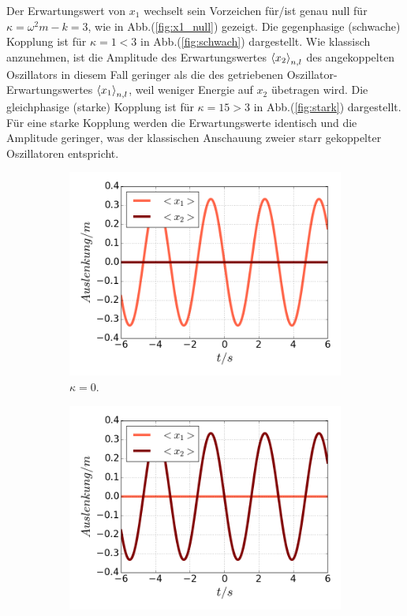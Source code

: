     Der Erwartungswert von $x_1$ wechselt sein Vorzeichen für/ist genau null für $\kappa=\omega^2m-k=3$, wie in Abb.(\ref{fig:x1_null}) gezeigt.
    Die gegenphasige (schwache) Kopplung ist für $\kappa=1<3$ in Abb.(\ref{fig:schwach}) dargestellt. Wie klassisch anzunehmen, ist die Amplitude des Erwartungswertes $\braket{x_2}_{n,l}$ des angekoppelten Oszillators in diesem Fall geringer als die des getriebenen Oszillator-Erwartungswertes $\braket{x_1}_{n,l}$, weil weniger Energie auf $x_2$ übetragen wird.
    Die gleichphasige (starke) Kopplung ist für $\kappa=15>3$ in Abb.(\ref{fig:stark}) dargestellt.
    Für eine starke Kopplung werden die Erwartungswerte identisch und die Amplitude geringer, was der klassischen Anschauung zweier starr gekoppelter Oszillatoren entspricht.
\iffalse
    \begin{figure}
      \begin{subfigure}[t]{0.5\textwidth}
        \centering
        \includegraphics[width=\textwidth]{plots/<x2>nl0.png}
        \caption{$\kappa=0$.}
        \label{fig:x2_null}
      \end{subfigure}
      \begin{subfigure}[t]{0.5\textwidth}
          \centering
          \includegraphics[width=\textwidth]{plots/<x1>nl0.png}

\end{subfigure}
\end{figure}
